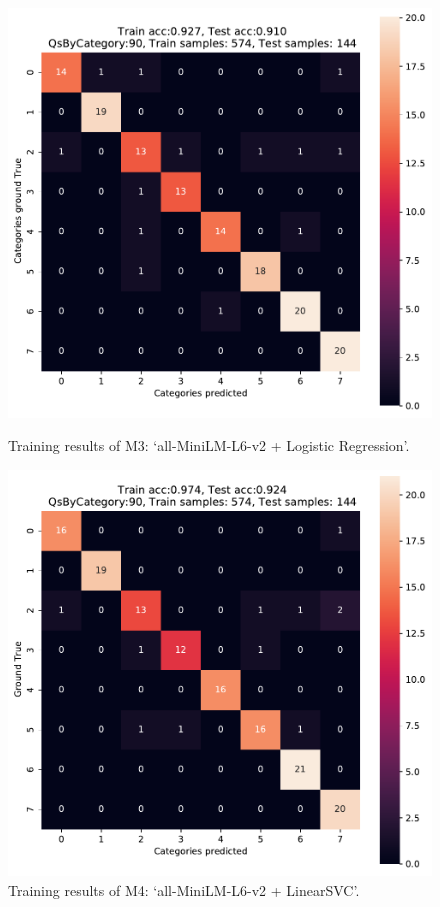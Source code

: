 \begin{figure}[ht!]
    \centering
    \begin{minipage}[c]{0.49\linewidth}
        \includegraphics[width=\textwidth]{images/training/training_m3_v2.pdf}
        \caption{Training results of M3: `all-MiniLM-L6-v2 + Logistic Regression'.}
        \label{fig:m3}
    \end{minipage}
    \begin{minipage}[c]{0.49\linewidth}
        \includegraphics[width=\textwidth]{images/training/training_m4_v2.pdf}
        \caption{Training results of M4: `all-MiniLM-L6-v2 + LinearSVC'.}
        \label{fig:m4}
    \end{minipage}
\end{figure}

